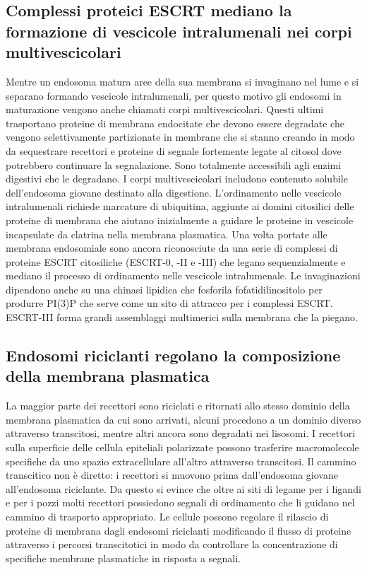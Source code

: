 \subsection{Complessi proteici ESCRT mediano la formazione di vescicole intralumenali nei corpi multivescicolari}
Mentre un endosoma matura aree della sua membrana si invaginano nel lume e si separano formando vescicole intralumenali, per questo motivo gli endosomi in maturazione vengono anche 
chiamati corpi multivescicolari. Questi ultimi trasportano proteine di membrana endocitate che devono essere degradate che vengono selettivamente partizionate in membrane che si stanno
creando in modo da sequestrare recettori e proteine di segnale fortemente legate al citosol dove potrebbero continuare la segnalazione. Sono totalmente accessibili agli enzimi digestivi
che le degradano. I corpi multivescicolari includono contenuto solubile dell'endosoma giovane destinato alla digestione. L'ordinamento nelle vescicole intralumenali richiede marcature
di ubiquitina, aggiunte ai domini citosilici delle proteine di membrana che aiutano inizialmente a guidare le proteine in vescicole incapsulate da clatrina nella membrana plasmatica.
Una volta portate alle membrana endosomiale sono ancora riconosciute da una serie di complessi di  proteine ESCRT citosiliche (ESCRT-0, -II e -III) che legano sequenzialmente e mediano
il processo di ordinamento nelle vescicole intralumenale. Le invaginazioni dipendono anche su una chinasi lipidica che fosforila fofatidilinositolo per produrre PI(3)P che serve come un
sito di attracco per i complessi ESCRT. ESCRT-III forma grandi assemblaggi multimerici sulla membrana che la piegano.
\subsection{Endosomi riciclanti regolano la composizione della membrana plasmatica}
La maggior parte dei recettori sono riciclati e ritornati allo stesso dominio della membrana plasmatica da cui sono arrivati, alcuni procedono a un dominio diverso attraverso 
transcitosi, mentre altri ancora sono degradati nei lisosomi. I recettori sulla superficie delle cellula epiteliali polarizzate possono trasferire macromolecole specifiche da uno 
spazio extracellulare all'altro attraverso transcitosi. Il cammino transcitico non \`e diretto: i recettori si muovono prima dall'endosoma giovane all'endosoma riciclante. Da questo si
evince che oltre ai siti di legame per i ligandi e per i pozzi molti recettori possiedono segnali di ordinamento che li guidano nel cammino di trasporto appropriato. Le cellule possono
regolare il rilascio di proteine di membrana dagli endosomi riciclanti modificando il flusso di proteine attraverso i percorsi transcitotici in modo da controllare la concentrazione di
specifiche membrane plasmatiche in risposta a segnali. 

